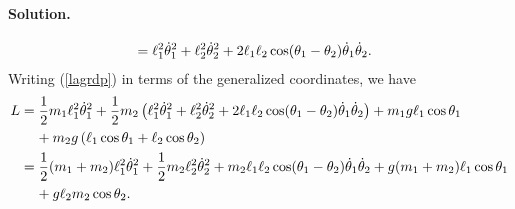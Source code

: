 \documentclass[11pt]{article}
\newcommand{\refeq}[1]{(\ref{#1})}
\newenvironment{solution}
{
    \paragraph{Solution.}
    \ignorespaces
}
{
    \bigskip
}
\begin{document}
\begin{solution}
\begin{align}
		&= \ell_1^2 \dot{\theta}_1^2 + \ell_2^2 \dot{\theta}_2^2 + 2 \ell_1 \ell_2 \cos(\theta_1 - \theta_2) \dot{\theta}_1 \dot{\theta}_2.
	\end{align}
	Writing \refeq{lagrdp} in terms of the generalized coordinates, we have
	\begin{align}
		L &= \frac{1}{2} m_1 \ell_1^2 \dot{\theta}_1^2 + \frac{1}{2} m_2 \left( \ell_1^2 \dot{\theta}_1^2 + \ell_2^2 \dot{\theta}_2^2 + 2 \ell_1 \ell_2 \cos(\theta_1 - \theta_2) \dot{\theta}_1 \dot{\theta}_2 \right) + m_1 g \ell_1 \cos{\theta_1} \notag \\
		&\phantom{=\ } + m_2 g \left( \ell_1 \cos{\theta_1} + \ell_2 \cos{\theta_2} \right) \\
		&= \frac{1}{2} (m_1 + m_2) \ell_1^2 \dot{\theta}_1^2 + \frac{1}{2} m_2 \ell_2^2 \dot{\theta}_2^2 + m_2 \ell_1 \ell_2 \cos(\theta_1 - \theta_2) \dot{\theta}_1 \dot{\theta}_2 + g (m_1 + m_2) \ell_1 \cos{\theta_1} \notag \\
		&\phantom{=\ } + g \ell_2 m_2 \cos{\theta_2}. \label{lagrdpnew}
	\end{align}
	

\end{solution}
\end{document}
